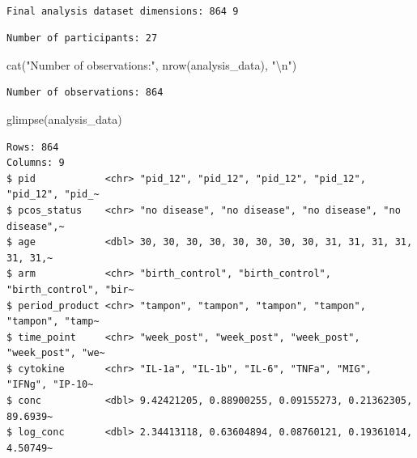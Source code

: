 \documentclass[
  letterpaper,
  DIV=11,
  numbers=noendperiod]{scrartcl}
\newenvironment{Shaded}{\begin{snugshade}}{\end{snugshade}}
\newcommand{\FunctionTok}[1]{\textcolor[rgb]{0.28,0.35,0.67}{#1}}
\newcommand{\NormalTok}[1]{\textcolor[rgb]{0.00,0.23,0.31}{#1}}
\newcommand{\SpecialCharTok}[1]{\textcolor[rgb]{0.37,0.37,0.37}{#1}}
\newcommand{\StringTok}[1]{\textcolor[rgb]{0.13,0.47,0.30}{#1}}
\begin{document}
\begin{verbatim}

Final analysis dataset dimensions: 864 9 
\end{verbatim}

\begin{Shaded}
\end{Shaded}

\begin{verbatim}
Number of participants: 27 
\end{verbatim}

\begin{Shaded}
\begin{Highlighting}[]
\FunctionTok{cat}\NormalTok{(}\StringTok{"Number of observations:"}\NormalTok{, }\FunctionTok{nrow}\NormalTok{(analysis\_data), }\StringTok{"}\SpecialCharTok{\textbackslash{}n}\StringTok{"}\NormalTok{)}
\end{Highlighting}
\end{Shaded}

\begin{verbatim}
Number of observations: 864 
\end{verbatim}

\begin{Shaded}
\begin{Highlighting}[]
\FunctionTok{glimpse}\NormalTok{(analysis\_data)}
\end{Highlighting}
\end{Shaded}

\begin{verbatim}
Rows: 864
Columns: 9
$ pid            <chr> "pid_12", "pid_12", "pid_12", "pid_12", "pid_12", "pid_~
$ pcos_status    <chr> "no disease", "no disease", "no disease", "no disease",~
$ age            <dbl> 30, 30, 30, 30, 30, 30, 30, 30, 31, 31, 31, 31, 31, 31,~
$ arm            <chr> "birth_control", "birth_control", "birth_control", "bir~
$ period_product <chr> "tampon", "tampon", "tampon", "tampon", "tampon", "tamp~
$ time_point     <chr> "week_post", "week_post", "week_post", "week_post", "we~
$ cytokine       <chr> "IL-1a", "IL-1b", "IL-6", "TNFa", "MIG", "IFNg", "IP-10~
$ conc           <dbl> 9.42421205, 0.88900255, 0.09155273, 0.21362305, 89.6939~
$ log_conc       <dbl> 2.34413118, 0.63604894, 0.08760121, 0.19361014, 4.50749~
\end{verbatim}
\end{document}
